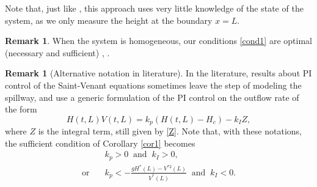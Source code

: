 \documentclass[JEP,XML,SOM,Unicode]{cedram}
\theoremstyle{definition}
\newtheorem{rmk}[thm]{Remark}
\begin{document}
{Note that, just like \cite{BastinCoronPI}, this approach uses very little knowledge of the state of the system, as we only measure the height at the boundary $x=L$.}

\begin{rmk}
{When the system is homogeneous, our conditions \eqref{cond1} are optimal (necessary and sufficient) \cite{BastinCoronTamasoiu2015}, \cite[\S 2.2.4.1]{BastinCoron1D}.}
\end{rmk}

\begin{rmk}[Alternative notation in literature]
In the literature, results about PI control of the Saint-Venant equations sometimes leave the step of modeling the spillway, and use a generic formulation of the PI control on the outflow rate of the form\vspace*{-3pt}
\begin{equation*}
H(t,L)V(t,L)=k_{{p}}(H(t,L)-H_{c})-k_{{I}}Z,
\end{equation*}
where $Z$ is the integral term, still given by \eqref{Z}.
Note that, with these notations, the sufficient condition of Corollary \ref{cor1} becomes\vspace*{-3pt}
\begin{equation*}
\begin{split}
&k_{p}>0\;\;\text{and}\;\;k_{I}>0,\\
\text{or}\quad&k_{p}<-\frac{gH^{*}(L)-V^{*2}(L)}{V^{*}(L)}\;\;\text{and}\;\;k_{I}<0.
\end{split}
\end{equation*}
\end{rmk}
\end{document}
